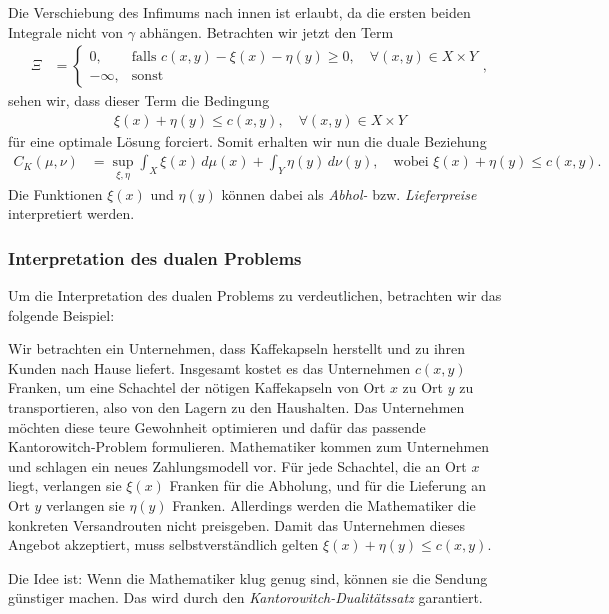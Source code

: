 Die Verschiebung des Infimums nach innen ist erlaubt,
da die ersten beiden Integrale nicht von $\gamma$ abhängen.
Betrachten wir jetzt den Term
\begin{align*}
\Xi
&=
\begin{cases}
0,
& \text{falls } c(x,y) - \xi(x) - \eta(y) \geq 0
,\quad\forall (x,y) \in X \times Y
\\
-\infty,
& \text{sonst}
\end{cases}
,
\end{align*}
sehen wir,
dass dieser Term die Bedingung
\begin{align*}
\xi(x) + \eta(y) \leq c(x,y)
,\quad
\forall (x,y) \in X \times Y
\end{align*}
für eine optimale Lösung forciert.
Somit erhalten wir nun die duale Beziehung
\begin{align*}
C_K(\mu, \nu)
&=
\sup_{\xi, \eta}
\int_X \xi(x)\, d\mu(x)
+ \int_Y \eta(y)\, d\nu(y)
,\quad\text{wobei }
\xi(x) + \eta(y) \leq c(x,y)
.
\end{align*}
Die Funktionen $\xi(x)$ und $\eta(y)$ können dabei als
\emph{Abhol-} bzw. \emph{Lieferpreise} interpretiert werden.

\subsubsection{Interpretation des dualen Problems}
Um die Interpretation des dualen Problems zu verdeutlichen,
betrachten wir das folgende Beispiel:

Wir betrachten ein Unternehmen,
dass Kaffekapseln herstellt und zu ihren Kunden nach Hause liefert.
Insgesamt kostet es das Unternehmen $c(x,y)$ Franken,
um eine Schachtel der nötigen Kaffekapseln von Ort $x$ zu Ort $y$ zu transportieren,
also von den Lagern zu den Haushalten.
Das Unternehmen möchten diese teure Gewohnheit optimieren und
dafür das passende Kantorowitch-Problem formulieren.
Mathematiker kommen zum Unternehmen und schlagen ein neues Zahlungsmodell vor.
Für jede Schachtel,
die an Ort $x$ liegt,
verlangen sie $\xi(x)$ Franken für die Abholung,
und für die Lieferung an Ort $y$ verlangen sie $\eta(y)$ Franken.
Allerdings werden die Mathematiker die konkreten Versandrouten nicht preisgeben.
Damit das Unternehmen dieses Angebot akzeptiert,
muss selbstverständlich gelten $\xi(x)+\eta(y) \leq c(x,y)$.


Die Idee ist:
Wenn die Mathematiker klug genug sind,
können sie die Sendung günstiger machen.
Das wird durch den \emph{Kantorowitch-Dualitätssatz} garantiert.

